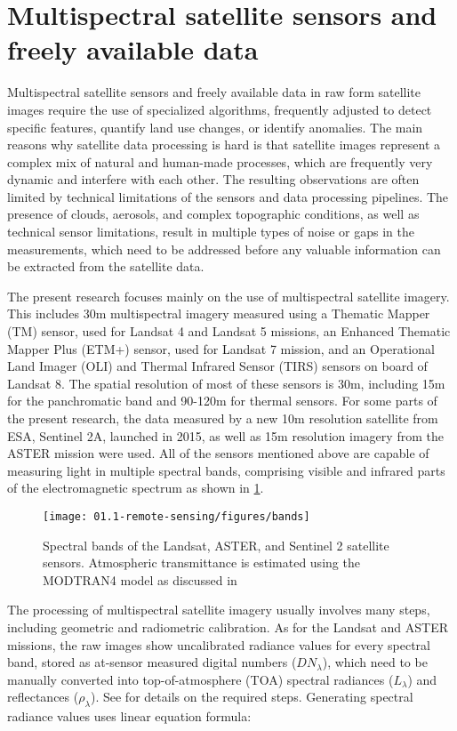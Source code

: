 \section{Multispectral satellite sensors and freely available data}

Multispectral satellite sensors and freely available data in raw form satellite images require the use of specialized algorithms, frequently adjusted to detect specific features, quantify land use changes, or identify anomalies. The main reasons why satellite data processing is hard is that satellite images represent a complex mix of natural and human-made processes, which are frequently very dynamic and interfere with each other. The resulting observations are often limited by technical limitations of the sensors and data processing pipelines. The presence of clouds, aerosols, and complex topographic conditions, as well as technical sensor limitations, result in multiple types of noise or gaps in the measurements, which need to be addressed before any valuable information can be extracted from the satellite data.

The present research focuses mainly on the use of multispectral satellite imagery. This includes 30m multispectral imagery measured using a Thematic Mapper (TM) sensor, used for Landsat 4 and Landsat 5 missions, an Enhanced Thematic Mapper Plus (ETM+) sensor, used for Landsat 7 mission, and an Operational Land Imager (OLI) and Thermal Infrared Sensor (TIRS) sensors on board of Landsat 8. The spatial resolution of most of these sensors is 30m, including 15m for the panchromatic band and 90-120m for thermal sensors. For some parts of the present research, the data measured by a new 10m resolution satellite from ESA, Sentinel 2A, launched in 2015, as well as 15m resolution imagery from the ASTER mission were used. All of the sensors mentioned above are capable of measuring light in multiple spectral bands, comprising visible and infrared parts of the electromagnetic spectrum as shown in \ref{fig:sensor-bands}.

\begin{figure}
	\texttt{[image: 01.1-remote-sensing/figures/bands]}
	\caption{Spectral bands of the Landsat, ASTER, and Sentinel 2 satellite sensors. Atmospheric transmittance is estimated using the MODTRAN4 model as discussed in \citep{verhoef2003simulation}}
	\label{fig:sensor-bands}
\end{figure}

The processing of multispectral satellite imagery usually involves many steps, including geometric and radiometric calibration. As for the Landsat and ASTER missions, the raw images show uncalibrated radiance values for every spectral band, stored as at-sensor measured digital numbers ($DN_\lambda$), which need to be manually converted into top-of-atmosphere (TOA) spectral radiances ($L_\lambda$) and reflectances ($\rho_\lambda$). See \citep{chander2009summary} for details on the required steps. Generating spectral radiance values uses linear equation formula: 

